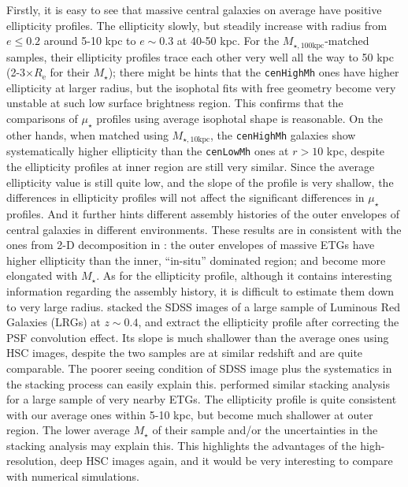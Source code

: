 \documentclass{emulateapj}
\def\rbcg{\texttt{cenHighMh}}
\def\nbcg{\texttt{cenLowMh}}
\def\mstar{{$M_{\star}$}}
\def\minn{{$M_{\star,10\mathrm{kpc}}$}}
\def\mtot{{$M_{\star,100\mathrm{kpc}}$}}
\def\mden{{$\mu_{\star}$}}
\newcommand{\update}[1]{\textcolor{Bittersweet}{#1}}
\begin{document}
\begin{CJK*}{UTF8}{gbsn}
    \update{
    Firstly, it is easy to see that massive central galaxies on average have positive 
    ellipticity profiles. 
    The ellipticity slowly, but steadily increase with radius from $e\le 0.2$ around 
    5-10 kpc to $e\sim 0.3$ at 40-50 kpc.  
    For the \mtot{}-matched samples, their ellipticity profiles trace each other 
    very well all the way to 50 kpc (2-3$\times R_{\mathrm{e}}$ for their \mstar{}); 
    there might be hints that the \rbcg{} ones have higher ellipticity at larger 
    radius, but the isophotal fits with free geometry become very unstable at such 
    low surface brightness region. 
    This confirms that the comparisons of \mden{} profiles using average isophotal 
    shape is reasonable. 
    On the other hands, when matched using \minn{}, the \rbcg{} galaxies show 
    systematically higher ellipticity than the \nbcg{} ones at $r > 10$ kpc, despite 
    the ellipticity profiles at inner region are still very similar. 
    Since the average ellipticity value is still quite low, and the slope of the 
    profile is very shallow, the differences in ellipticity profiles will not affect 
    the significant differences in \mden{} profiles. 
    And it further hints different assembly histories of the outer envelopes of
    central galaxies in different environments. 
    These results are in consistent with the ones from 2-D decomposition in
    \citep{Huang2013a}: the outer envelopes of massive ETGs have higher ellipticity 
    than the inner, ``in-situ'' dominated region; and become more elongated with 
    \mstar{}. 
    As for the ellipticity profile, although it contains interesting information 
    regarding the assembly history, it is difficult to estimate them down to very 
    large radius. 
    \citet{Tal2011} stacked the SDSS images of a large sample of Luminous Red 
    Galaxies (LRGs) at $z\sim 0.4$, and extract the ellipticity profile after 
    correcting the PSF convolution effect.   
    Its slope is much shallower than the average ones using HSC images, despite the 
    two samples are at similar redshift and are quite comparable. 
    The poorer seeing condition of SDSS image plus the systematics in the stacking 
    process can easily explain this. 
    \citet{DSouza2015} performed similar stacking analysis for a large sample of very 
    nearby ETGs.  
    The ellipticity profile is quite consistent with our average ones within 5-10 
    kpc, but become much shallower at outer region.  
    The lower average \mstar{} of their sample and/or the uncertainties in the 
    stacking analysis may explain this.  
    This highlights the advantages of the high-resolution, deep HSC images again,
    and it would be very interesting to compare with numerical simulations. 
    }
    

\end{CJK*}
\end{document}
